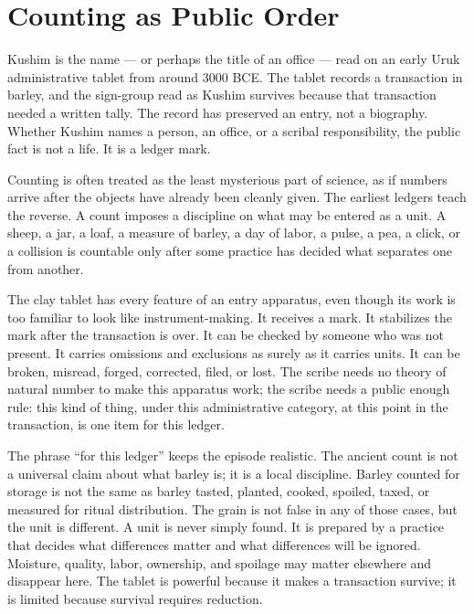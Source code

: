 \section{Counting as Public Order}

Kushim is the name --- or perhaps the title of an office --- read on an early
Uruk administrative tablet from around 3000 BCE. The tablet records a
transaction in barley, and the sign-group read as Kushim survives because
that transaction needed a written tally. The record has preserved an entry,
not a biography. Whether Kushim names a person, an office, or a scribal
responsibility, the public fact is not a life. It is a ledger mark.

Counting is often treated as the least mysterious part of science, as if
numbers arrive after the objects have already been cleanly given. The
earliest ledgers teach the reverse. A count imposes a discipline on what may
be entered as a unit. A sheep, a jar, a loaf, a measure of barley, a day of
labor, a pulse, a pea, a click, or a collision is countable only after some
practice has decided what separates one from another.

The clay tablet has every feature of an entry apparatus, even though its
work is too familiar to look like instrument-making. It receives a mark. It
stabilizes the mark after the transaction is over. It can be checked by
someone who was not present. It carries omissions and exclusions as surely
as it carries units. It can be broken, misread, forged, corrected, filed,
or lost. The scribe needs no theory of natural number to make this apparatus
work; the scribe needs a public enough rule: this kind of thing, under this
administrative category, at this point in the transaction, is one item for
this ledger.

The phrase ``for this ledger'' keeps the episode realistic. The ancient
count is not a universal claim about what barley is; it is a local discipline. Barley counted
for storage is not the same as barley tasted, planted, cooked, spoiled,
taxed, or measured for ritual distribution. The grain is not false in any
of those cases, but the unit is different. A unit is never simply found.
It is prepared by a practice that decides what differences matter and what
differences will be ignored. Moisture, quality, labor, ownership, and
spoilage may matter elsewhere and disappear here. The tablet is powerful
because it makes a transaction survive; it is limited because survival
requires reduction.

